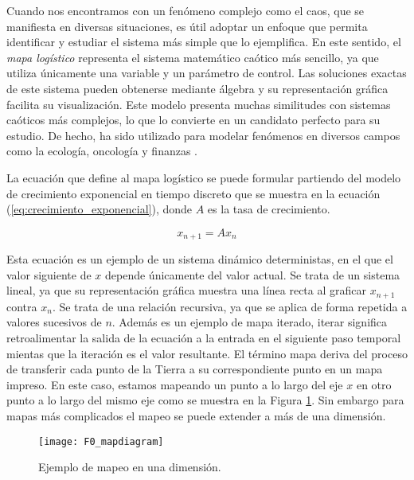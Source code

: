         Cuando nos encontramos con un fenómeno complejo como el caos, que se manifiesta en diversas situaciones, es útil adoptar un enfoque que permita identificar y estudiar el sistema más simple que lo ejemplifica. En este sentido, el \emph{mapa logístico} representa el sistema matemático caótico más sencillo, ya que utiliza únicamente una variable y un parámetro de control. Las soluciones exactas de este sistema pueden obtenerse mediante álgebra y su representación gráfica facilita su visualización. Este modelo presenta muchas similitudes con sistemas caóticos más complejos, lo que lo convierte en un candidato perfecto para su estudio. De hecho, ha sido utilizado para modelar fenómenos en diversos campos como la ecología, oncología y finanzas \cite{Sprott2003}.

        La ecuación que define al mapa logístico se puede formular partiendo del modelo de crecimiento exponencial en tiempo discreto que se muestra en la ecuación (\ref{eq:crecimiento_exponencial}), donde $A$ es la tasa de crecimiento.

        \begin{equation}
            x_{n+1} = A x_{n}
            \label{eq:crecimiento_exponencial}
        \end{equation}

        Esta ecuación es un ejemplo de un sistema dinámico deterministas, en el que el valor siguiente de $x$ depende únicamente del valor actual. Se trata de un sistema lineal, ya que su representación gráfica muestra una línea recta al graficar $x_{n+1}$ contra $x_{n}$. Se trata de una relación recursiva, ya que se aplica de forma repetida a valores sucesivos de $n$. Además es un ejemplo de mapa iterado, iterar significa retroalimentar la salida de la ecuación a la entrada en el siguiente paso temporal mientas que la iteración es el valor resultante. El término mapa deriva del proceso de transferir cada punto de la Tierra a su correspondiente punto en un mapa impreso. En este caso, estamos mapeando un punto a lo largo del eje $x$ en otro punto a lo largo del mismo eje como se muestra en la Figura \ref{fig:F0_mapdiagram}. Sin embargo para mapas más complicados el mapeo se puede extender a más de una dimensión. 


        \begin{figure}[hbtp]
            \caption{Ejemplo de mapeo en una dimensión.}
            \centering
            \texttt{[image: F0\_mapdiagram]}
            \label{fig:F0_mapdiagram}
        \end{figure}


